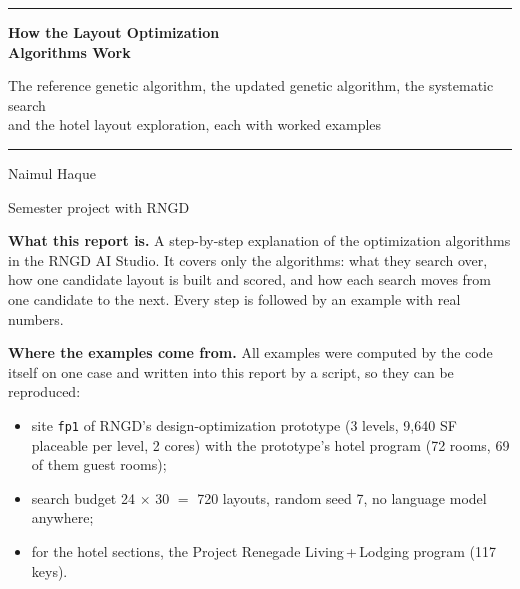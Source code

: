 \documentclass[10pt,a4paper]{article}
\newcommand{\code}[1]{\texttt{\small #1}}
\begin{document}
\begin{titlepage}\centering
\vspace*{1.5cm}
{\color{bpdeep}\rule{\linewidth}{1.2pt}}\par\vspace{0.6cm}
{\huge\bfseries\color{bpdeep} How the Layout Optimization\\[0.3em] Algorithms Work}\par\vspace{0.5cm}
{\large The reference genetic algorithm, the updated genetic algorithm, the systematic search\\
and the hotel layout exploration, each with worked examples}\par\vspace{0.4cm}
{\color{bpdeep}\rule{\linewidth}{1.2pt}}\par\vspace{1.0cm}
{\large Naimul Haque}\par{\normalsize Semester project with RNGD}\par\vspace{0.3cm}{\normalsize October 2026}\par
\vspace{1.0cm}
\begin{minipage}{0.88\linewidth}\small
\textbf{What this report is.} A step-by-step explanation of the optimization algorithms in the RNGD AI Studio. It
covers only the algorithms: what they search over, how one candidate layout is built and scored, and how each search
moves from one candidate to the next. Every step is followed by an example with real numbers.

\textbf{Where the examples come from.} All examples were computed by the code itself on one case and written into this
report by a script, so they can be reproduced:
\begin{itemize}
\item site \code{fp1} of RNGD's design-optimization prototype (3 levels, 9,640 SF placeable per level,
2 cores) with the prototype's hotel program (72 rooms, 69 of them guest rooms);
\item search budget 24 $\times$ 30 $=$ 720 layouts, random seed 7, no language model anywhere;
\item for the hotel sections, the Project Renegade Living\,+\,Lodging program (117 keys).
\end{itemize}


\end{minipage}
\end{titlepage}
\end{document}
